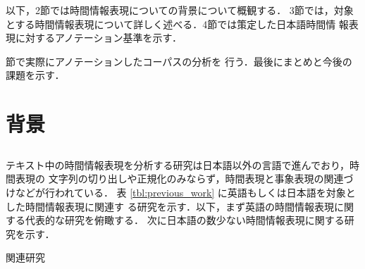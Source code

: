 \documentclass[japanese]{jnlp_1.4}
\newcommand{\modified}[1]{}
\begin{document}
以下，2節では時間情報表現についての背景について概観する．
3節では，対象とする時間情報表現について詳しく述べる．4節では策定した日本語時間情
報表現に対するアノテーション基準を示す．
\modified{5節でアノテーションにおける日本語特有の問題について説明する．}
\modified{6節でアノテーション作業環境を示す．}
\modified{7}節で実際にアノテーションしたコーパスの分析を
行う．最後にまとめと今後の課題を示す．



\section{背景 \label{sec:previous_work}}

\subsection{\modified{時間情報表現に関する関連研究}}

テキスト中の時間情報表現を分析する研究は日本語以外の言語で進んでおり，時間表現の
文字列の切り出しや正規化のみならず，時間表現と事象表現の関連づけなどが行われている．
表 \ref{tbl:previous_work} に英語もしくは日本語を対象とした時間情報表現に関連す
る研究を示す．以下，まず英語の時間情報表現に関する代表的な研究を俯瞰する．
次に日本語の数少ない時間情報表現に関する研究を示す．

\begin{table}[b]
\caption{関連研究}
\label{tbl:previous_work}

\end{table}
\end{document}
